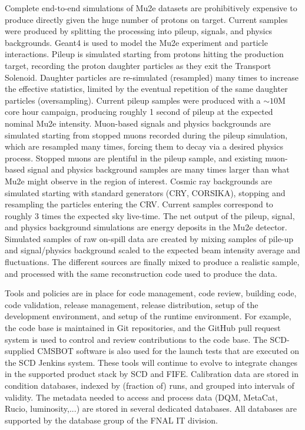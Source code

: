 Complete end-to-end simulations of Mu2e datasets are prohibitively expensive to produce directly given the huge number of protons on target. Current samples were produced by splitting the processing into pileup, signals, and physics backgrounds. Geant4 is used to model the Mu2e experiment and particle interactions. Pileup is simulated starting from protons hitting the production target, recording the proton daughter particles as they exit the Transport Solenoid. Daughter particles are re-simulated (resampled) many times to increase the effective statistics, limited by the eventual repetition of the same daughter particles (oversampling). Current pileup samples were produced with a $\sim 10$M core hour campaign, producing roughly 1 second of pileup at the expected nominal Mu2e intensity. Muon-based signals and physics backgrounds are simulated starting from stopped muons recorded during the pileup simulation, which are resampled many times, forcing them to decay via a desired physics process. Stopped muons are plentiful in the pileup sample, and existing muon-based signal and physics background samples are many times larger than what Mu2e might observe in the region of interest. Cosmic ray backgrounds are simulated starting with standard generators (CRY, CORSIKA), stopping and resampling the particles entering the CRV. Current samples correspond to roughly 3 times the expected \runone sky live-time. The net output of the pileup, signal, and physics background simulations are energy deposits in the Mu2e detector. Simulated samples of raw on-spill data are created by mixing samples of pile-up and signal/physics background scaled to the expected beam intensity average and fluctuations. The different sources are finally mixed to produce a realistic sample, and processed with the same reconstruction code used to produce the data. 

Tools and policies are in place for code management, code review, building code, code validation, release management, release distribution, setup of the development environment, and setup of the runtime environment. For example, the code base is maintained in Git repositories, and the GitHub pull request system is used to control and review contributions to the code base. The SCD-supplied CMSBOT software is also used for the launch tests that are executed on the SCD Jenkins system. These tools will continue to evolve to integrate changes in the supported product stack by SCD and FIFE. Calibration data are stored in condition databases, indexed by (fraction of) runs, and grouped into intervals of validity. The metadata needed to access and process data (DQM, MetaCat, Rucio, luminosity,...) are stored in several dedicated databases. All databases are supported by the database group of the FNAL IT division. 

